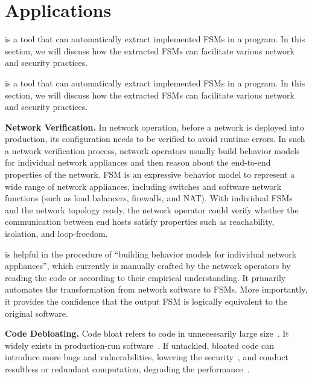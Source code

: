 
\section{Applications}
\Tool{} is a tool that can automatically extract implemented FSMs in a program. 
In this section, we will discuss how the extracted FSMs can facilitate 
various network and security practices.  


\Tool{} is a tool that can automatically extract implemented FSMs in a program. 
In this section, we will discuss how the extracted FSMs can facilitate 
various network and security practices.  


\noindent\textbf{Network Verification.}  In network operation, before a network 
is deployed into production, its configuration needs to be verified to avoid 
runtime errors. In such a network verification process, network operators 
usually build behavior models for individual network appliances and then 
reason about the end-to-end properties of the network\cite{mai2011debugging,khurshid2013veriflow,kazemian2012header,kazemian2013real,fayaz2016buzz,panda2017verifying}. FSM is an expressive 
behavior model to represent a wide range of network appliances, including 
switches and software network functions (such as load balancers, firewalls, 
and NAT). With individual FSMs and the network topology ready, the network 
operator could verify whether the communication between end hosts satisfy 
properties such as reachability, isolation, and loop-freedom.\cite{}

\Tool{} is helpful in the procedure of ``building behavior models for 
individual network appliances'', which currently is manually crafted by 
the network operators by reading the code or according to their 
empirical understanding. It primarily automates the 
transformation from network software to FSMs. More importantly, it 
provides the confidence that the output FSM is logically equivalent 
to the original software.

\noindent\textbf{Code Debloating.}
Code bloat refers to code in unnecessarily large size~\cite{code-bloat}.
It widely exists in production-run software~\cite{code-bloat-study}. 
If untackled, bloated code can introduce more bugs and vulnerabilities, 
lowering the security~\cite{protocol-mao}, 
and conduct resultless or redundant computation, 
degrading the performance~\cite{BloatFSE2008,XuBloatPLDI2009,XuBloatPLDI2010}. 

